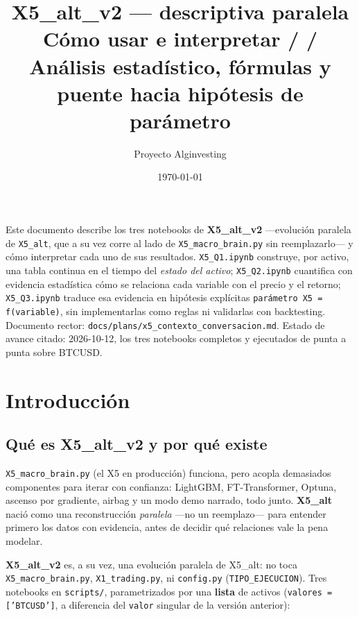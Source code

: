 \documentclass[11pt,a4paper]{article}
\title{\vspace{-1.4cm}\textbf{X5\_alt\_v2 — descriptiva paralela}\\[6pt]
  \large Cómo usar e interpretar \code{X5\_Q1} / \code{X5\_Q2} / \code{X5\_Q3}\\[4pt]
  \normalsize\color{cgris} Análisis estadístico, fórmulas y puente hacia hipótesis de parámetro}
\author{Proyecto Alginvesting}
\date{\today}
\newcommand{\code}[1]{\texttt{\small #1}}
\newcommand{\bigsep}{\par\vspace{3pt}}
\begin{document}
\maketitle
\thispagestyle{empty}

\begin{center}
\begin{minipage}{0.88\linewidth}
\small\color{cgris}
Este documento describe los tres notebooks de \textbf{X5\_alt\_v2} —evolución paralela de
\code{X5\_alt}, que a su vez corre al lado de \code{X5_macro_brain.py} sin reemplazarlo— y
cómo interpretar cada uno de sus resultados. \code{X5\_Q1.ipynb} construye, por activo, una
tabla continua en el tiempo del \emph{estado del activo}; \code{X5\_Q2.ipynb} cuantifica con
evidencia estadística cómo se relaciona cada variable con el precio y el retorno;
\code{X5\_Q3.ipynb} traduce esa evidencia en hipótesis explícitas
\code{parámetro X5 = f(variable)}, sin implementarlas como reglas ni validarlas con
backtesting. Documento rector: \code{docs/plans/x5\_contexto\_conversacion.md}. Estado de
avance citado: 2026-10-12, los tres notebooks completos y ejecutados de punta a punta sobre
BTCUSD.
\end{minipage}
\end{center}

\vspace{8pt}
\tableofcontents
\newpage

\section{Introducción}

\subsection{Qué es X5\_alt\_v2 y por qué existe}

\code{X5\_macro\_brain.py} (el X5 en producción) funciona, pero acopla demasiados
componentes para iterar con confianza: LightGBM, FT-Transformer, Optuna, ascenso por
gradiente, airbag y un modo demo narrado, todo junto. \textbf{X5\_alt} nació como una
reconstrucción \emph{paralela} —no un reemplazo— para entender primero los datos con
evidencia, antes de decidir qué relaciones vale la pena modelar.

\bigsep
\textbf{X5\_alt\_v2} es, a su vez, una evolución paralela de X5\_alt: no toca
\code{X5\_macro\_brain.py}, \code{X1\_trading.py}, ni \code{config.py}
(\code{TIPO\_EJECUCION}). Tres notebooks en \code{scripts/}, parametrizados por una
\textbf{lista} de activos (\code{valores = ['BTCUSD']}, a diferencia del \code{valor}
singular de la versión anterior):
\end{document}
